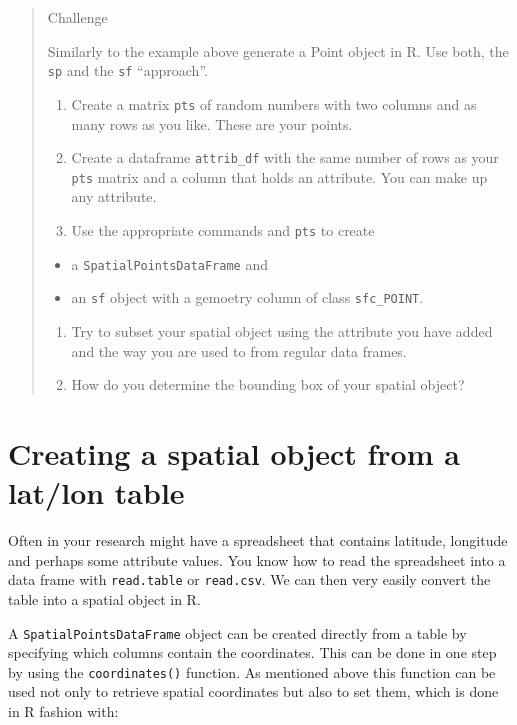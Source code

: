 \documentclass[]{book}
\providecommand{\tightlist}{%
  \setlength{\itemsep}{0pt}\setlength{\parskip}{0pt}}
\theoremstyle{definition}
\theoremstyle{definition}
\theoremstyle{definition}
\theoremstyle{remark}
\begin{document}
\begin{quote}
Challenge

Similarly to the example above generate a Point object in R. Use both,
the \texttt{sp} and the \texttt{sf} ``approach''.

\begin{enumerate}
\def\labelenumi{\arabic{enumi}.}
\tightlist
\item
  Create a matrix \texttt{pts} of random numbers with two columns and as
  many rows as you like. These are your points.
\item
  Create a dataframe \texttt{attrib\_df} with the same number of rows as
  your \texttt{pts} matrix and a column that holds an attribute. You can
  make up any attribute.
\item
  Use the appropriate commands and \texttt{pts} to create
\end{enumerate}

\begin{itemize}
\tightlist
\item
  a \texttt{SpatialPointsDataFrame} and
\item
  an \texttt{sf} object with a gemoetry column of class
  \texttt{sfc\_POINT}.
\end{itemize}

\begin{enumerate}
\def\labelenumi{\arabic{enumi}.}
\setcounter{enumi}{3}
\tightlist
\item
  Try to subset your spatial object using the attribute you have added
  and the way you are used to from regular data frames.
\item
  How do you determine the bounding box of your spatial object?
\end{enumerate}
\end{quote}

\section{Creating a spatial object from a lat/lon
table}\label{creating-a-spatial-object-from-a-latlon-table}

Often in your research might have a spreadsheet that contains latitude,
longitude and perhaps some attribute values. You know how to read the
spreadsheet into a data frame with \texttt{read.table} or
\texttt{read.csv}. We can then very easily convert the table into a
spatial object in R.

A \texttt{SpatialPointsDataFrame} object can be created directly from a
table by specifying which columns contain the coordinates. This can be
done in one step by using the \texttt{coordinates()} function. As
mentioned above this function can be used not only to retrieve spatial
coordinates but also to set them, which is done in R fashion with:
\end{document}
